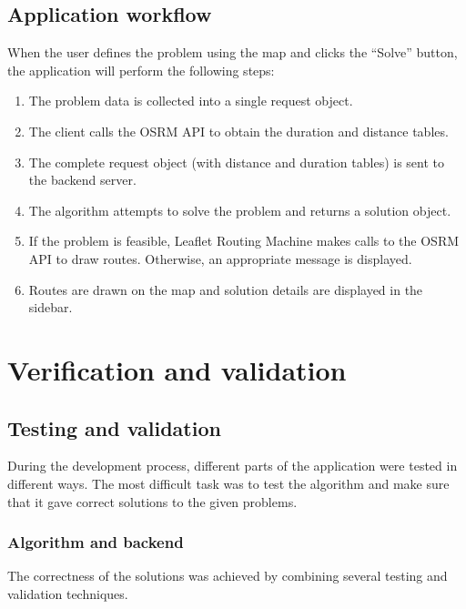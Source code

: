 \documentclass[a4paper,twoside,12pt]{book}
\begin{document}
\section{Application workflow}

When the user defines the problem using the map and clicks the ``Solve'' button, the application will perform the following steps: 

\begin{enumerate}
    \item The problem data is collected into a single request object.
    \item  The client calls the OSRM API to obtain the duration and distance tables.
    \item The complete request object (with distance and duration tables) is sent to the backend server.
    \item The algorithm attempts to solve the problem and returns a solution object.
    \item If the problem is feasible, Leaflet Routing Machine makes calls to the OSRM API to draw routes. Otherwise, an appropriate message is displayed.
    \item Routes are drawn on the map and solution details are displayed in the sidebar.
\end{enumerate}


\chapter{Verification and validation}
\section{Testing and validation}
During the development process, different parts of the application were tested in different ways. The most difficult task was to test the algorithm and make sure that it gave correct solutions to the given problems. 
\subsection{Algorithm and backend}
The correctness of the solutions was achieved by combining several testing and validation techniques.
\end{document}
